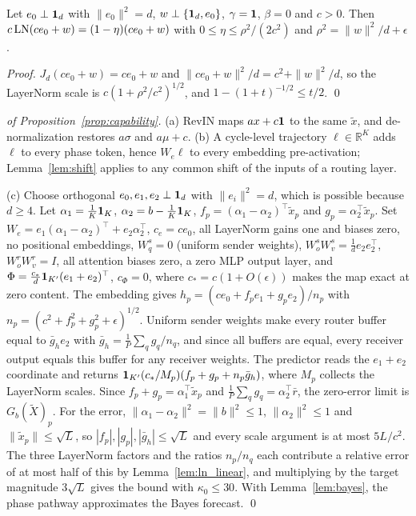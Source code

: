 {\begin{lemma}
\label{lem:ln_linear}
Let $e_0\perp\mathbf 1_d$ with $\|e_0\|^2=d$, $w\perp\{\mathbf 1_d,e_0\}$, $\gamma=\mathbf 1$, $\beta=0$ and $c>0$. Then $c\operatorname{LN}(ce_0+w)=(1-\eta)(ce_0+w)$ with $0\le\eta\le\rho^2/(2c^2)$ and $\rho^2=\|w\|^2/d+\epsilon$.
\end{lemma}

\begin{proof}
$J_d(ce_0+w)=ce_0+w$ and $\|ce_0+w\|^2/d=c^2+\|w\|^2/d$, so the LayerNorm scale is $c(1+\rho^2/c^2)^{1/2}$, and $1-(1+t)^{-1/2}\le t/2$. \qed
\end{proof}

\begin{proof}[of Proposition~\ref{prop:capability}]
(a) RevIN maps $ax+c\mathbf 1$ to the same $\tilde x$, and de-normalization restores $a\sigma$ and $a\mu+c$. (b) A cycle-level trajectory $\ell\in\mathbb R^K$ adds $\ell$ to every phase token, hence $W_e\ell$ to every embedding pre-activation; Lemma~\ref{lem:shift} applies to any common shift of the inputs of a routing layer.

(c) Choose orthogonal $e_0,e_1,e_2\perp\mathbf 1_d$ with $\|e_i\|^2=d$, which is possible because $d\ge4$. Let $\alpha_1=\tfrac1K\mathbf 1_K$, $\alpha_2=b-\tfrac1K\mathbf 1_K$, $f_p=(\alpha_1-\alpha_2)^\top\tilde x_p$ and $g_p=\alpha_2^\top\tilde x_p$. Set $W_e=e_1(\alpha_1-\alpha_2)^\top+e_2\alpha_2^\top$, $c_e=ce_0$, all LayerNorm gains one and biases zero, no positional embeddings, $W^s_q=0$ (uniform sender weights), $W^s_oW^s_v=\tfrac1de_2e_2^\top$, $W^r_oW^r_v=I$, all attention biases zero, a zero MLP output layer, and $\Phi=\tfrac{c_*}{d}\mathbf 1_{K'}(e_1+e_2)^\top$, $c_\Phi=0$, where $c_*=c(1+O(\epsilon))$ makes the map exact at zero content. The embedding gives $h_p=(ce_0+f_pe_1+g_pe_2)/n_p$ with $n_p=(c^2+f_p^2+g_p^2+\epsilon)^{1/2}$. Uniform sender weights make every router buffer equal to $\bar g_he_2$ with $\bar g_h=\tfrac1P\sum_qg_q/n_q$, and since all buffers are equal, every receiver output equals this buffer for any receiver weights. The predictor reads the $e_1+e_2$ coordinate and returns $\mathbf 1_{K'}(c_*/M_p)(f_p+g_p+n_p\bar g_h)$, where $M_p$ collects the LayerNorm scales. Since $f_p+g_p=\alpha_1^\top\tilde x_p$ and $\tfrac1P\sum_qg_q=\alpha_2^\top\bar r$, the zero-error limit is $G_b(\tilde X)_p$. For the error, $\|\alpha_1-\alpha_2\|^2=\|b\|^2\le1$, $\|\alpha_2\|^2\le1$ and $\|\tilde x_p\|\le\sqrt L$, so $|f_p|,|g_p|,|\bar g_h|\le\sqrt L$ and every scale argument is at most $5L/c^2$. The three LayerNorm factors and the ratios $n_p/n_q$ each contribute a relative error of at most half of this by Lemma~\ref{lem:ln_linear}, and multiplying by the target magnitude $3\sqrt L$ gives the bound with $\kappa_0\le30$. With Lemma~\ref{lem:bayes}, the phase pathway approximates the Bayes forecast. \qed
\end{proof}

}
